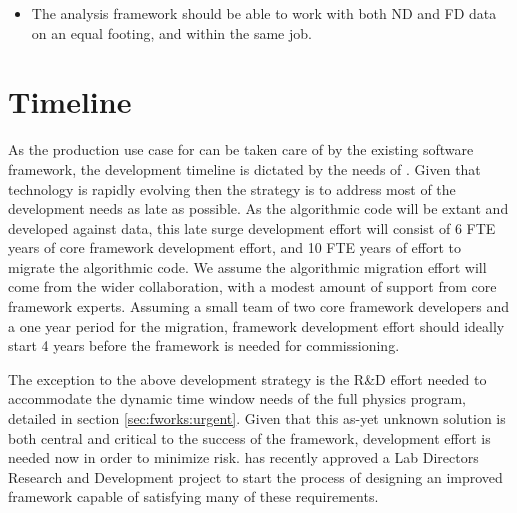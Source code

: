 \documentclass[../main-v1.tex]{subfiles}
\begin{document}
\begin{itemize}
\item The analysis framework should be able to work with both ND and FD data on an equal footing, and within the same job.


\end{itemize}



\section{Timeline}

As the production use case for  can be taken care of by the existing software framework, the development timeline is dictated by the needs of .  Given that technology is rapidly evolving then the strategy is to address most of the development needs as late as possible. As the algorithmic code will be extant and developed against  data, this late surge development effort will consist of 6 FTE years of core framework development effort, and 10 FTE years of effort to migrate the algorithmic code.  We assume the algorithmic migration effort will come from the wider collaboration, with a modest amount of support from core framework experts.
Assuming a small team of two core framework developers
and a one year period for the migration, framework development effort should ideally start 4 years before the framework is needed for commissioning.

The exception to the above development strategy is the R\&D effort needed to accommodate the dynamic time window needs of the full  physics program, detailed in section \ref{sec:fworks:urgent}.  Given that this as-yet unknown solution is both central and critical to the success of the framework, development effort is needed now in order to minimize risk.
 has recently approved a Lab Directors Research and Development project to start the process of designing an improved framework capable of satisfying many of these requirements. 


\end{document}
